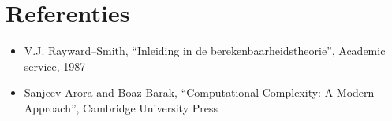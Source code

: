 \section{Referenties}
\begin{itemize}
\item V.J. Rayward--Smith, ``Inleiding in de berekenbaarheidstheorie'',
Academic service, 1987
\item Sanjeev Arora and Boaz Barak, ``Computational Complexity: A Modern Approach'',
Cambridge University Press
\end{itemize}



